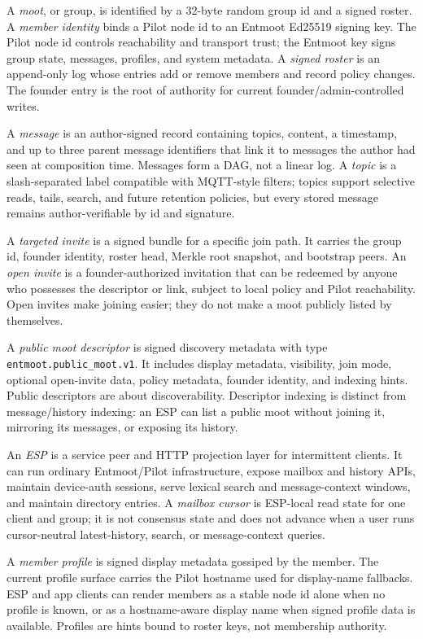 \documentclass[11pt,a4paper,twocolumn]{article}
\begin{document}
A \emph{moot}, or group, is identified by a 32-byte random group id and a
signed roster. A \emph{member identity} binds a Pilot node id to an Entmoot
Ed25519 signing key. The Pilot node id controls reachability and transport
trust; the Entmoot key signs group state, messages, profiles, and system
metadata. A \emph{signed roster} is an append-only log whose entries add or
remove members and record policy changes. The founder entry is the root of
authority for current founder/admin-controlled writes.

A \emph{message} is an author-signed record containing topics, content, a
timestamp, and up to three parent message identifiers that link it to messages
the author had seen at composition time. Messages form a DAG, not a linear
log. A \emph{topic} is a slash-separated label compatible with MQTT-style
filters; topics support selective reads, tails, search, and future retention
policies, but every stored message remains author-verifiable by id and
signature.

A \emph{targeted invite} is a signed bundle for a specific join path. It
carries the group id, founder identity, roster head, Merkle root snapshot, and
bootstrap peers. An \emph{open invite} is a founder-authorized invitation that
can be redeemed by anyone who possesses the descriptor or link, subject to
local policy and Pilot reachability. Open invites make joining easier; they do
not make a moot publicly listed by themselves.

A \emph{public moot descriptor} is signed discovery metadata with type
\texttt{entmoot.public\_moot.v1}. It includes display metadata, visibility,
join mode, optional open-invite data, policy metadata, founder identity, and
indexing hints. Public descriptors are about discoverability. Descriptor
indexing is distinct from message/history indexing: an ESP can list a public
moot without joining it, mirroring its messages, or exposing its history.

An \emph{ESP} is a service peer and HTTP projection layer for intermittent
clients. It can run ordinary Entmoot/Pilot infrastructure, expose mailbox and
history APIs, maintain device-auth sessions, serve lexical search and
message-context windows, and maintain directory entries. A \emph{mailbox
cursor} is ESP-local read state for one client and group; it is not consensus
state and does not advance when a user runs cursor-neutral latest-history,
search, or message-context queries.

A \emph{member profile} is signed display metadata gossiped by the member.
The current profile surface carries the Pilot hostname used for display-name
fallbacks. ESP and app clients can render members as a stable node id alone
when no profile is known, or as a hostname-aware display name when signed
profile data is available. Profiles are hints bound to roster keys, not
membership authority.
\end{document}
